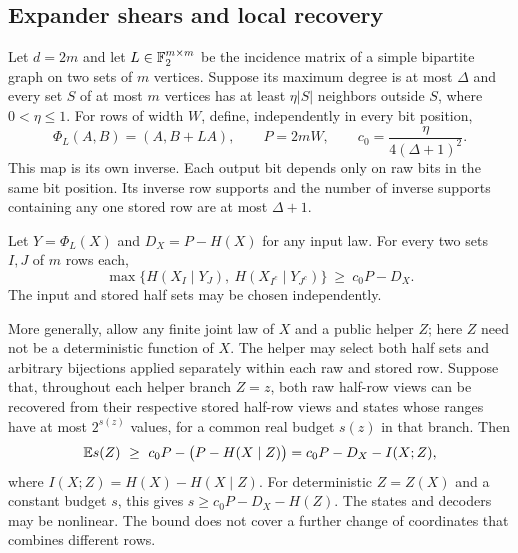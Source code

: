 \subsection{Expander shears and local recovery}

Let $d=2m$ and let $L\in\mathbb F_2^{m\times m}$ be the incidence matrix of a simple
bipartite graph on two sets of $m$ vertices. Suppose its maximum degree is
at most $\Delta$ and every set $S$ of at most $m$ vertices has at least
$\eta|S|$ neighbors outside $S$, where $0<\eta\le1$. For rows of width $W$,
define, independently in every bit position,
\begin{equation}\label{eq:expander-shear}
 \Phi_L(A,B)=(A,B+LA),\qquad P=2mW,\qquad
 c_0=\frac{\eta}{4(\Delta+1)^2}.
\end{equation}
This map is its own inverse. Each output bit depends only on raw bits in the
same bit position. Its inverse row supports and the number of inverse
supports containing any one stored row are at most $\Delta+1$.

\begin{theorem}\label{thm:shear-recovery}
Let $Y=\Phi_L(X)$ and $D_X=P-H(X)$ for any input law. For every two sets
$I,J$ of $m$ rows each,
\begin{equation}\label{eq:shear-half-entropy}
 \max\{H(X_I\mid Y_J),\ H(X_{I^c}\mid Y_{J^c})\}
 \ \ge\ c_0P-D_X.
\end{equation}
The input and stored half sets may be chosen independently.

More generally, allow any finite joint law of $X$ and a public helper $Z$;
here $Z$ need not be a deterministic function of $X$. The helper may select
both half sets and arbitrary bijections applied separately within each raw
and stored row. Suppose that, throughout each helper branch $Z=z$, both
raw half-row views can be recovered from their respective stored half-row
views and states whose ranges have at most $2^{s(z)}$ values, for a common
real budget $s(z)$ in that branch. Then
\begin{equation}\label{eq:shear-helper-recovery}
 \mathbb E s(Z)\ \ge\ c_0P-\bigl(P-H(X\mid Z)\bigr)
       =c_0P-D_X-I(X;Z),
\end{equation}
where $I(X;Z)=H(X)-H(X\mid Z)$. For deterministic $Z=Z(X)$ and a constant
budget $s$, this gives $s\ge c_0P-D_X-H(Z)$. The states and decoders may be
nonlinear. The bound does not cover a further change of coordinates that
combines different rows.
\end{theorem}

